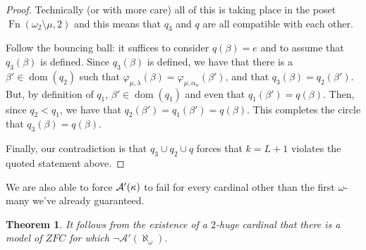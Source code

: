 \documentclass{amsart}
\theoremstyle{plain}
\newtheorem{theorem}{Theorem}
\theoremstyle{definition}
\theoremstyle{remark}
\theoremstyle{plain}
\theoremstyle{definition}
\theoremstyle{remark}
\begin{document}
\begin{proof}
            Technically (or with more care)  all of this is taking place in the
            poset $\operatorname{Fn}(\omega_2\setminus \mu,2)$ and this means
            that $q_3$ and $q$ are all compatible with each other.


            Follow
            the bouncing ball: it suffices to consider
             $q(\beta)=e$ and to assume that $q_3(\beta)$ is defined.
            Since $q_3(\beta)$ is defined, we have that
            there is a  $\beta'\in\mathop{dom}(q_2)$ such that $
             \varphi_{\mu,\lambda}(\beta) = \varphi_{\mu,\alpha_n}(\beta')$,
            and that $q_3(\beta) = q_2(\beta')$.
            But, by definition of $q_1$, $\beta'\in\mathop{dom}(q_1)$
            and even  that $q_1(\beta') = q(\beta)$.
             Then, since $q_2<q_1$, we have that $q_2(\beta')=q_1(\beta') =
             q(\beta)$. This completes the circle that $q_3(\beta) = q(\beta)$.
            \bigskip

            Finally, our contradiction is that $q_3\cup q_2\cup q$
            forces that
             $k=L+1$ violates the quoted statement above.
            \end{proof}


  We are also able to force \(\mathcal{A}'(\kappa)\) to fail for every cardinal
  other than the first \(\omega\)-many we've already guaranteed.

\begin{theorem} It follows from the existence of a $2$-huge cardinal
that there is a model of $ZFC$ for which $\lnot \mathcal A'(\aleph_{\omega})$.
\end{theorem}
\end{document}
